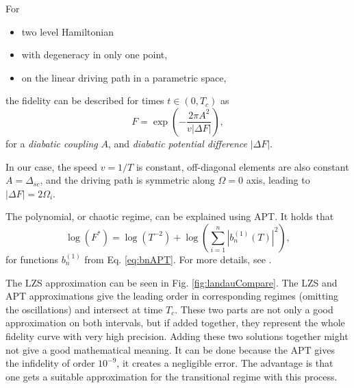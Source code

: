 \begin{thm}
    For 
    \begin{itemize}
        \item two level Hamiltonian
        \item with degeneracy in only one point,
        \item on the linear driving path in a parametric space,
    \end{itemize}
    the fidelity can be described for times $t\in(0,T_c)$ as
    \begin{equation}
        F = \exp\left(-\frac{2 \pi A^2}{v|\Delta F|}\right),
        \label{eq:exponentialPart}
    \end{equation}
    for a \emph{diabatic coupling} $A$, and \emph{diabatic potential difference} $|\Delta F|$. 
\end{thm}

In our case, the speed $v=1/T$ is constant, off-diagonal elements are also constant $A=\Delta_{sc}$, and the driving path is symmetric along $\Omega=0$ axis, leading to $|\Delta F|=2\Omega_i$.

The polynomial, or chaotic regime, can be explained using APT. It holds that
\begin{equation}
    \log(F^*)=\log(T^{-2})+\log\left(\sum_{i=1}^n |b_n^{(1)}(T)|^2\right),
    \label{eq:polynomialPart}
\end{equation}
for functions $b_n^{(1)}$ from Eq. \ref{eq:bnAPT}. For more details, see \citet{felipe}.

The LZS approximation can be seen in Fig. \ref{fig:landauCompare}. The LZS and APT approximations give the leading order in corresponding regimes (omitting the oscillations) and intersect at time $T_c$. These two parts are not only a good approximation on both intervals, but if added together, they represent the whole fidelity curve with very high precision. Adding these two solutions together might not give a good mathematical meaning. It can be done because the APT gives the infidelity of order $10^{-9}$, it creates a negligible error. The advantage is that one gets a suitable approximation for the transitional regime with this process.


